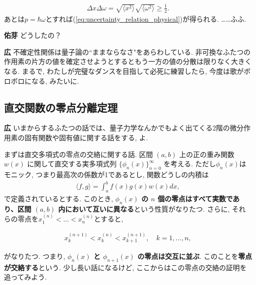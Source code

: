 \documentclass{ltjsarticle}
\theoremstyle{definition}
\newcommand{\parno}{\par\noindent}
\begin{document}
\begin{align}
  \Delta x\Delta\omega=\sqrt{\langle x^2\rangle}\sqrt{\langle\omega^2\rangle}\ge\frac12.
\end{align}
あとは$p=\hbar\omega$とすれば(\ref{eq:uncertainty_relation_physical})が得られる. ……ふふ.\parno
\textbf{佑芽} どうしたの？\parno
\textbf{広} 不確定性関係は量子論の``ままならなさ"をあらわしている. 非可換なふたつの作用素の片方の値を確定させようとするともう一方の値の分散は限りなく大きくなる. まるで, わたしが完璧なダンスを目指して必死に練習したら, 今度は歌がボロボロになる, みたいに.

\subsection{直交関数の零点分離定理}
\noindent
\textbf{広} いまからするふたつの話では、量子力学なんかでもよく出てくる2階の微分作用素の固有関数や固有値に関する話をする, よ. 

まずは直交多項式の零点の交絡に関する話. 区間 $(a, b)$ 上の正の重み関数 $w(x)$ に関して直交する実多項式列 $\{\phi_n(x)\}_{n=0}^\infty$ を考える. ただし$\phi_n(x)$はモニック, つまり最高次の係数が1であるとし, 関数どうしの内積は
\begin{align}
  \langle f, g \rangle = \int_a^b f(x)g(x)w(x) dx,
\end{align}
で定義されているとする. このとき, \textbf{$\phi_n(x)$ の $n$ 個の零点はすべて実数であり、区間 $(a, b)$ 内において互いに異なる}という性質がなりたつ. さらに, それらの零点を$x_1^{(n)}<\dots< x_n^{(n)}$とすると,
\begin{tcolorbox}
\begin{align}
  x_k^{(n+1)}<x_k^{(n)}<x_{k+1}^{(n+1)},\quad k=1,\dots, n,\label{eq:zero_interlacing}
\end{align}
\end{tcolorbox}
\noindent
がなりたつ. つまり, \textbf{$\phi_n(x)$ と $\phi_{n+1}(x)$ の零点は交互に並ぶ}. このことを\textbf{零点が交絡する}という. 少し長い話になるけど, ここからはこの零点の交絡の証明を追ってみよう.
\end{document}

